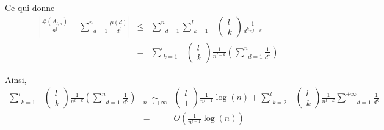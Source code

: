 Ce qui donne
\begin{eqnarray*}
  \left| \frac{\# (A_{l, n})}{n^l} - \underset{d = 1}{\overset{n}{\sum}}
  \frac{\mu (d)}{d^l} \right| & \leqslant & \underset{d =
  1}{\overset{n}{\sum}} \underset{k = 1}{\overset{l}{\sum}} \begin{array}{c}
    \\
    
  \end{array} \left( \begin{array}{c}
    l\\
    k
  \end{array} \right) \frac{1}{d^k n^{l - k}}\\
  & = & \underset{k = 1}{\overset{l}{\sum}} \begin{array}{c}
    \\
    
  \end{array} \left( \begin{array}{c}
    l\\
    k
  \end{array} \right) \frac{1}{n^{l - k}} \left( \underset{d =
  1}{\overset{n}{\sum}} \frac{1}{d^k } \right)
\end{eqnarray*}


Ainsi,
\begin{eqnarray*}
  \underset{k = 1}{\overset{l}{\sum}} \begin{array}{c}
    \\
    
  \end{array} \left( \begin{array}{c}
    l\\
    k
  \end{array} \right) \frac{1}{n^{l - k}} \left( \underset{d =
  1}{\overset{n}{\sum}} \frac{1}{d^k } \right) & \underset{n \rightarrow +
  \infty}{\sim} & \left( \begin{array}{c}
    l\\
    1
  \end{array} \right) \frac{1}{n^{l - 1}} \log (n) + \underset{k =
  2}{\overset{l}{\sum}} \begin{array}{c}
    \\
    
  \end{array} \left( \begin{array}{c}
    l\\
    k
  \end{array} \right) \frac{1}{n^{l - k}} \underset{d = 1}{\overset{+
  \infty}{\sum}} \frac{1}{d^k }\\
  & = & O \left( \frac{1}{n^{l - 1}} \log (n) \right)
\end{eqnarray*}


